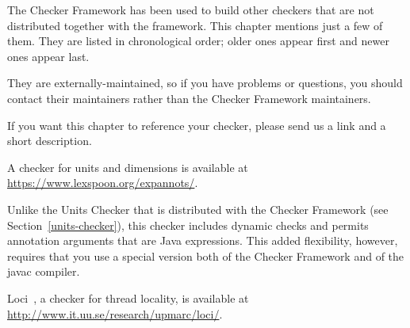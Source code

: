 \htmlhr
{}

The Checker Framework has been used to build other checkers that are not
distributed together with the framework.  This chapter mentions just a few
of them.  They are listed in chronological order; older ones appear first
and newer ones appear last.

They are externally-maintained, so if you have problems or questions, you
should contact their maintainers rather than the Checker Framework
maintainers.

If you want this chapter to reference your checker,
please send us a link and a short description.








A checker for units and dimensions is available at
\url{https://www.lexspoon.org/expannots/}.

Unlike the Units Checker that is distributed with the Checker Framework
(see Section~\ref{units-checker}), this checker includes dynamic checks and
permits annotation arguments that are Java expressions.  This added
flexibility, however, requires that you use a special version both of the
Checker Framework and of the javac compiler.



Loci~\cite{WrigstadPMZV2009}, a checker for thread locality, is available at
\url{http://www.it.uu.se/research/upmarc/loci/}.








